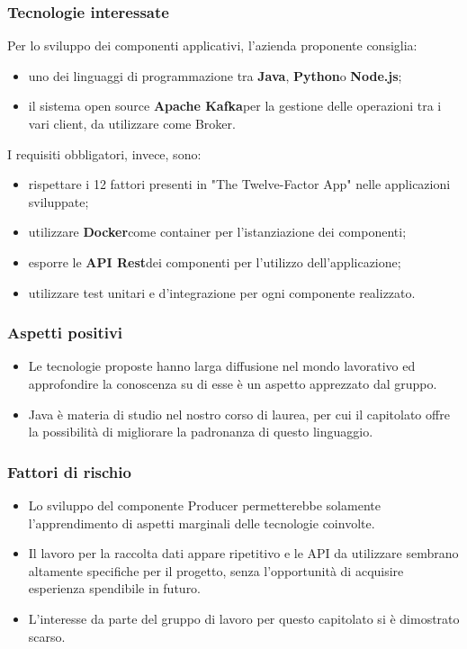 \subsubsection{Tecnologie interessate}
Per lo sviluppo dei componenti applicativi, l'azienda proponente consiglia:
\begin{itemize}
	\item uno dei linguaggi di programmazione tra \textbf{Java}\glo,
	\textbf{Python}\glosp o \textbf{Node.js}\glo;
	\item il sistema open source \textbf{Apache Kafka}\glosp per la gestione delle
	operazioni tra i vari client, da utilizzare come Broker.
\end{itemize}
I requisiti obbligatori, invece, sono:
\begin{itemize}
	\item rispettare i 12 fattori presenti in "The Twelve-Factor App" nelle 
	applicazioni sviluppate;
	\item utilizzare \textbf{Docker}\glosp come container per l'istanziazione dei componenti;
	\item esporre le \textbf{API Rest}\glosp dei componenti per l'utilizzo dell'applicazione; 
	\item utilizzare test unitari e d'integrazione per ogni componente 
	realizzato.
\end{itemize}
\subsubsection{Aspetti positivi}
\begin{itemize}
	\item Le tecnologie proposte hanno larga diffusione nel mondo lavorativo ed
	 approfondire la conoscenza su di esse è un aspetto apprezzato dal gruppo.
	\item Java è materia di studio nel nostro corso di laurea, per cui il
	 capitolato offre la possibilità di migliorare la padronanza di questo
	 linguaggio.
\end{itemize}
\subsubsection{Fattori di rischio}
\begin{itemize}
	\item Lo sviluppo del componente Producer permetterebbe solamente l'apprendimento di aspetti marginali delle tecnologie coinvolte.
	\item Il lavoro per la raccolta dati appare ripetitivo 
	 e le API da utilizzare sembrano altamente specifiche per il progetto, senza l'opportunità di acquisire esperienza spendibile in futuro.
	\item L'interesse da parte del gruppo di lavoro per questo capitolato si è 
dimostrato scarso.
	
\end{itemize}

